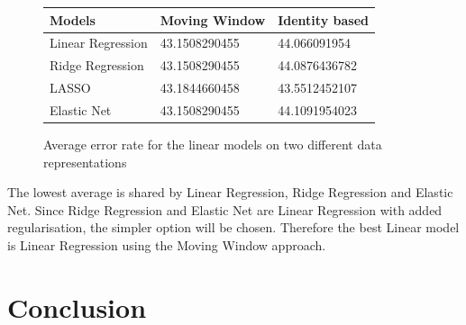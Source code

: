 \begin{figure}[b!]
\centering
\begin{tabular}{l || l | l}
Models & Moving Window & Identity based \\ \hline \hline
Linear Regression & 43.1508290455 & 44.066091954 \\ \hline
Ridge Regression & 43.1508290455 & 44.0876436782 \\ \hline
LASSO & 43.1844660458 & 43.5512452107 \\ \hline
Elastic Net & 43.1508290455 & 44.1091954023 \\ \hline
\end{tabular}
\caption{Average error rate for the linear models on two different data representations}
\label{table:linearmodelsaverages}
\end{figure}

The lowest average is shared by Linear Regression, Ridge Regression and Elastic Net. Since Ridge Regression and Elastic Net are Linear Regression with added regularisation, the simpler option will be chosen. Therefore the best Linear model is Linear Regression using the Moving Window approach.

\section{Conclusion}

